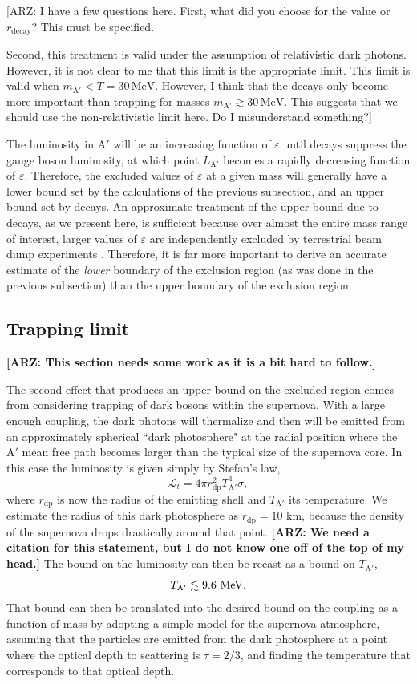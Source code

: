 \documentclass[nofootinbib,prd,superscriptaddress,twocolumn]{revtex4}
\newcommand{\beq}{\begin{equation}}
\newcommand{\eeq}{\end{equation}}
\newcommand{\Aprime}{\mathrm{A}'}
\newcommand{\rdp}{r_{\mathrm{dp}}}
\newcommand{\arz}[1]{{{\bf{\color{BrickRed}[ARZ: #1]}}}}
\begin{document}
\arz{I have a few questions here. First, what did you choose for the value or $r_{\mathrm{decay}}$? This must 
be specified. 
 
Second, this treatment is valid under the assumption of relativistic dark photons. However, it is not clear to me that this limit is 
the appropriate limit. This limit is valid when $m_{\mathrm{A}'} < T = 30 \, \mathrm{MeV}$. However, I think that 
the decays only become more important than trapping for masses $m_{\mathrm{A}'} \gtrsim 30\, \mathrm{MeV}$. 
This suggests that we should use the non-relativistic limit here. Do I misunderstand something?}


The luminosity in $\Aprime$ will be an increasing function of $\varepsilon$ until decays suppress the gauge boson luminosity, 
at which point $L_{\mathrm{A}'}$ becomes a rapidly decreasing function of $\varepsilon$. Therefore, the excluded values of 
$\varepsilon$ at a given mass will generally have a lower bound set by the calculations of the previous subsection, and an 
upper bound set by decays. An approximate treatment of the upper bound due to decays, as we present here, is 
sufficient because over almost the entire mass range of interest, larger values of $\varepsilon$ are independently 
excluded by terrestrial beam dump experiments \cite{bjorken_etal09}. Therefore, it is far more important to 
derive an accurate estimate of the {\em lower} boundary of the exclusion region (as was done in 
the previous subsection) than the upper boundary of the exclusion region.

\subsection{Trapping limit}

\arz{This section needs some work as it is a bit hard to follow.}


The second effect that produces an upper bound on the excluded region 
comes from considering trapping of dark bosons within the supernova. 
With a large enough coupling, the dark photons will thermalize and then 
will be emitted from an approximately spherical ``dark photosphere" at the radial position 
where the $\Aprime$ mean free path becomes larger than the typical size of the supernova core. 
In this case the luminosity is given simply by Stefan's law, 
\beq
\mathcal{L}_t  = 4\pi \rdp^2 T_{\mathrm{A}'}^4 \sigma,
\eeq
where $\rdp$ is now the radius of the emitting shell and $T_{\mathrm{A}'}$ its temperature. 
We estimate the radius of this dark photosphere as $\rdp=10$ km, 
because the density of the supernova drops drastically around that point. 
\arz{We need a citation for this statement, but I do not know one off of the top of my head.}
The bound on the luminosity can then be recast as a bound on $T_{\mathrm{A}'}$, 
%
\beq
T_{\mathrm{A}'} \lesssim 9.6\rm\ MeV.
\eeq
%
That bound can then be translated into the desired bound on the coupling as a function of mass by adopting a 
simple model for the supernova atmosphere, assuming that the particles are emitted from the dark photosphere 
at a point where the optical depth to scattering is $\tau = 2/3 $, and finding the temperature that corresponds 
to that optical depth. 
\end{document}
